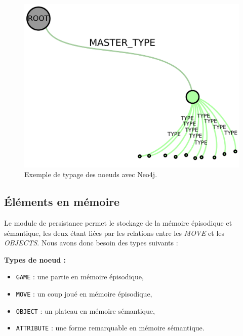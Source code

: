 \begin{figure}[H]
\includegraphics[width=\textwidth]{files/neo4j/example_node_type}
\caption{Exemple de typage des noeuds avec Neo4j.}
\label{example_node_type}
\end{figure}

\subsection{Éléments en mémoire}

Le module de persistance permet le stockage de la mémoire épisodique et sémantique, les deux étant liées par les relations entre les \emph{MOVE} et les \emph{OBJECTS}. Nous avons donc besoin des types suivants : 

\textbf{Types de noeud :}
\begin{itemize}
	\item \texttt{GAME} : une partie en mémoire épisodique, 
	\item \texttt{MOVE} : un coup joué en mémoire épisodique,
	\item \texttt{OBJECT} : un plateau en mémoire sémantique,
	\item \texttt{ATTRIBUTE} : une forme remarquable en mémoire sémantique.
\end{itemize}


